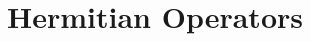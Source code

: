 \documentclass[main.tex]{subfiles}
\begin{document}
\section{Hermitian Operators}

\clearpage
\end{document}
